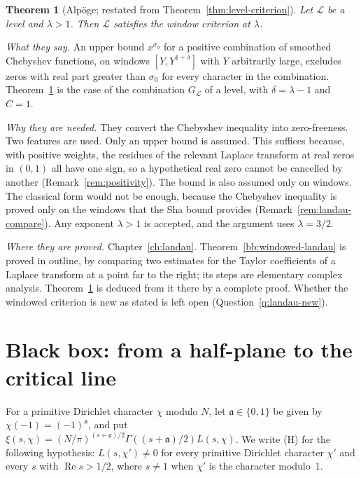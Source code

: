\documentclass[11pt]{amsbook}
\theoremstyle{plain}
\newtheorem{theorem}{Theorem}[section]
\theoremstyle{definition}
\theoremstyle{remark}
\numberwithin{equation}{section}
\numberwithin{figure}{chapter}
\numberwithin{table}{chapter}
\newcommand{\lev}{\mathscr{L}}
\begin{document}
\begin{theorem}[Alp\"oge; restated from
Theorem~\ref{thm:level-criterion}]
\label{bb:level-criterion}
Let $\lev$ be a level and $\lambda>1$. Then $\lev$ satisfies the
window criterion at $\lambda$.
\end{theorem}

\noindent\emph{What they say.} An upper bound $x^{\sigma_0}$ for a
positive combination of smoothed Chebyshev functions, on windows
$[Y,Y^{1+\delta}]$ with $Y$ arbitrarily large, excludes zeros with
real part greater than $\sigma_0$ for every character in the
combination. Theorem~\ref{bb:level-criterion} is the case of the
combination $G_\lev$ of a level, with $\delta=\lambda-1$ and $C=1$.

\noindent\emph{Why they are needed.} They convert the Chebyshev
inequality into zero-freeness. Two features are used. Only an upper
bound is assumed. This suffices because, with positive weights, the
residues of the relevant Laplace transform at real zeros in $(0,1)$
all have one sign, so a hypothetical real zero cannot be cancelled
by another (Remark~\ref{rem:positivity}). The bound is also assumed
only on windows. The classical form would not be enough, because
the Chebyshev inequality is proved only on the windows that the Sha
bound provides (Remark~\ref{rem:landau-compare}). Any exponent
$\lambda>1$ is accepted, and the argument uses $\lambda=3/2$.

\noindent\emph{Where they are proved.} Chapter~\ref{ch:landau}.
Theorem~\ref{bb:windowed-landau} is proved in outline, by comparing
two estimates for the Taylor coefficients of a Laplace transform at a
point far to the right; its steps are elementary complex analysis.
Theorem~\ref{bb:level-criterion} is deduced from it there by a
complete proof. Whether the windowed criterion is new as stated is
left open (Question~\ref{q:landau-new}).

\section{Black box: from a half-plane to the critical line}
\label{sec:bb-line}

For a primitive Dirichlet character $\chi$ modulo $N$, let
$\mathfrak a\in\{0,1\}$ be given by $\chi(-1)=(-1)^{\mathfrak a}$,
and put
$\xi(s,\chi)=(N/\pi)^{(s+\mathfrak a)/2}\Gamma((s+\mathfrak a)/2)
L(s,\chi)$. We write (H) for the following hypothesis:
$L(s,\chi')\ne0$ for every primitive Dirichlet character $\chi'$ and
every $s$ with $\operatorname{Re}s>1/2$, where $s\ne1$ when $\chi'$
is the character modulo~$1$.
\end{document}
